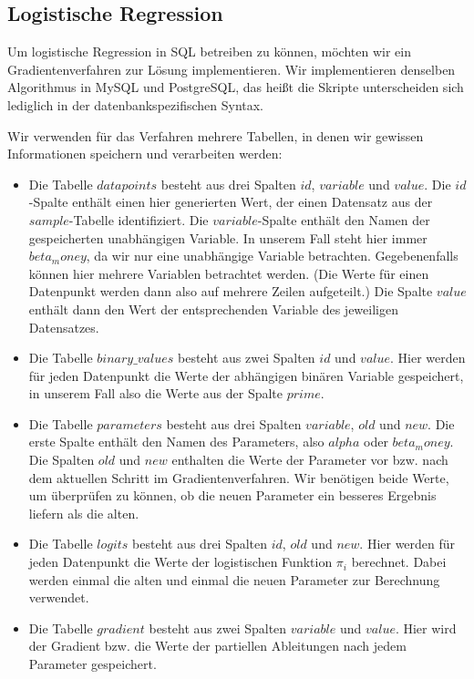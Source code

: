 \subsection{Logistische Regression}

Um logistische Regression in SQL betreiben zu können, möchten wir ein Gradientenverfahren zur Lösung implementieren. Wir implementieren denselben Algorithmus in MySQL und PostgreSQL, das heißt die Skripte unterscheiden sich lediglich in der datenbankspezifischen Syntax.

Wir verwenden für das Verfahren mehrere Tabellen, in denen wir gewissen Informationen speichern und verarbeiten werden:
\begin{itemize}
  \item Die Tabelle $datapoints$ besteht aus drei Spalten $id$, $variable$ und $value$. Die $id$-Spalte enthält einen hier generierten Wert, der einen Datensatz aus der $sample$-Tabelle identifiziert. Die $variable$-Spalte enthält den Namen der gespeicherten unabhängigen Variable. In unserem Fall steht hier immer $beta_money$, da wir nur eine unabhängige Variable betrachten. Gegebenenfalls können hier mehrere Variablen betrachtet werden. (Die Werte für einen Datenpunkt werden dann also auf mehrere Zeilen aufgeteilt.) Die Spalte $value$ enthält dann den Wert der entsprechenden Variable des jeweiligen Datensatzes.
  \item Die Tabelle $binary\_values$ besteht aus zwei Spalten $id$ und $value$. Hier werden für jeden Datenpunkt die Werte der abhängigen binären Variable gespeichert, in unserem Fall also die Werte aus der Spalte $prime$.
  \item Die Tabelle $parameters$ besteht aus drei Spalten $variable$, $old$ und $new$. Die erste Spalte enthält den Namen des Parameters, also $alpha$ oder $beta_money$. Die Spalten $old$ und $new$ enthalten die Werte der Parameter vor bzw. nach dem aktuellen Schritt im Gradientenverfahren. Wir benötigen beide Werte, um überprüfen zu können, ob die neuen Parameter ein besseres Ergebnis liefern als die alten.
  \item Die Tabelle $logits$ besteht aus drei Spalten $id$, $old$ und $new$. Hier werden für jeden Datenpunkt die Werte der logistischen Funktion $\pi_i$ berechnet. Dabei werden einmal die alten und einmal die neuen Parameter zur Berechnung verwendet.
  \item Die Tabelle $gradient$ besteht aus zwei Spalten $variable$ und $value$. Hier wird der Gradient bzw. die Werte der partiellen Ableitungen nach jedem Parameter gespeichert.
\end{itemize}

